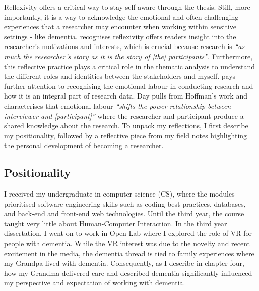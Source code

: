 Reflexivity offers a critical way to stay self-aware through the thesis. Still, more importantly, it is a way to acknowledge the emotional and often challenging experiences that a researcher may encounter when working within sensitive settings - like dementia. \cite{corlett2018reflexivity} recognises reflexivity offers readers insight into the researcher's motivations and interests, which is crucial because research is \textit{``as much the researcher's story as it is the story of [the] participants''}. Furthermore, this reflective practice plays a critical role in the thematic analysis to understand the different roles and identities between the stakeholders and myself. \cite{day2012reflexive} pays further attention to recognising the emotional labour in conducting research and how it is an integral part of research data. Day pulls from Hoffman's work and characterises that emotional labour \textit{``shifts the power relationship between interviewer and [participant]''} where the researcher and participant produce a shared knowledge about the research. To unpack my reflections, I first describe my positionality, followed by a reflective piece from my field notes highlighting the personal development of becoming a researcher.

\subsection{Positionality}
\label{Method:Positionality}
I received my undergraduate in computer science (CS), where the modules prioritised software engineering skills such as coding best practices, databases, and back-end and front-end web technologies. Until the third year, the course taught very little about Human-Computer Interaction. In the third year dissertation, I went on to work in Open Lab where I explored the role of VR for people with dementia. While the VR interest was due to the novelty and recent excitement in the media, the dementia thread is tied to family experiences where my Grandpa lived with dementia. Consequently, as I describe in chapter four, how my Grandma delivered care and described dementia significantly influenced my perspective and expectation of working with dementia. 

